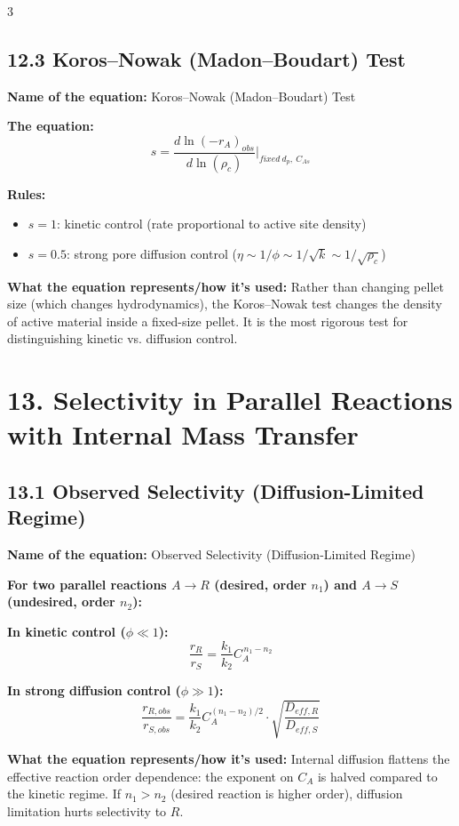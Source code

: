 \documentclass[8pt]{extarticle}
\begin{document}
\begin{multicols*}{3}
\subsection*{12.3 Koros--Nowak (Madon--Boudart) Test}

\textbf{Name of the equation:} Koros--Nowak (Madon--Boudart) Test

\textbf{The equation:}
\[
s
=
\frac{d\ln(-r_A)_{obs}}{d\ln(\rho_c)}
\bigg|_{fixed\ d_p,\ C_{As}}
\]

\textbf{Rules:}
\begin{itemize}
\item \(s=1\): kinetic control (rate proportional to active site density)
\item \(s=0.5\): strong pore diffusion control (\(\eta\sim 1/\phi\sim 1/\sqrt{k}\sim 1/\sqrt{\rho_c}\))
\end{itemize}

\textbf{What the equation represents/how it's used:} Rather than changing pellet size (which changes hydrodynamics), the Koros--Nowak test changes the density of active material inside a fixed-size pellet. It is the most rigorous test for distinguishing kinetic vs. diffusion control.

\section*{13. Selectivity in Parallel Reactions with Internal Mass Transfer}

\subsection*{13.1 Observed Selectivity (Diffusion-Limited Regime)}

\textbf{Name of the equation:} Observed Selectivity (Diffusion-Limited Regime)

\textbf{For two parallel reactions \(A\to R\) (desired, order \(n_1\)) and \(A\to S\) (undesired, order \(n_2\)):}

\textbf{In kinetic control (\(\phi\ll 1\)):}
\[
\frac{r_R}{r_S}
=
\frac{k_1}{k_2}C_A^{\,n_1-n_2}
\]

\textbf{In strong diffusion control (\(\phi\gg 1\)):}
\[
\frac{r_{R,obs}}{r_{S,obs}}
=
\frac{k_1}{k_2}
C_A^{(n_1-n_2)/2}
\cdot
\sqrt{\frac{D_{eff,R}}{D_{eff,S}}}
\]

\textbf{What the equation represents/how it's used:} Internal diffusion flattens the effective reaction order dependence: the exponent on \(C_A\) is halved compared to the kinetic regime. If \(n_1>n_2\) (desired reaction is higher order), diffusion limitation hurts selectivity to \(R\).


\end{multicols*}
\end{document}
